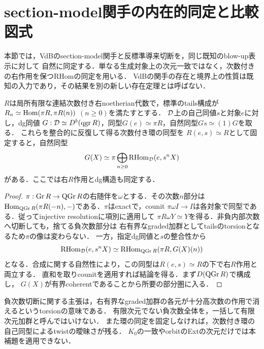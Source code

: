 \section{section-model関手の内在的同定と比較図式}\label{sec:canonicalcomparison}
本節では，VdBのsection-model関手と反標準導来切断を，同じ既知のblow-up表示に対して
自然に同定する．単なる生成対象上の次元一致ではなく，次数付きの右作用を保つRHomの同定を用いる．
VdBの関手の存在と境界上の性質は既知の入力であり，その結果を別の新しい存在定理とは呼ばない．

\begin{lemma}[導来切断によるpointed関手の認識]\label{lem:pointedrecognition}
$R$は局所有限な連結次数付き右noetherian代数で，標準のtails構成が
$R_n\simeq\operatorname{Hom}(\pi R,\pi R(n))$ $(n\ge0)$を満たすとする．
$\mathcal D$上の自己同値$s$と対象$e$に対し，dg同値
$G:\mathcal D\simeq D^b(\operatorname{qgr} R)$，同型$G(e)\simeq\pi R$，自然同型$Gs\simeq(1)G$を取る．
これらを整合的に反復して得る次数付き環の同型を
$R(e,s)\simeq R$として固定すると，自然同型
\[
 G(X)\simeq\pi\bigoplus_{n\ge0}\operatorname{RHom}_{\mathcal D}(e,s^nX)
\]
がある．ここでは右$R$作用とdg構造も同定する．
\end{lemma}
\begin{proof}
$\pi:\operatorname{Gr}R\to\operatorname{QGr} R$の右随伴を$\omega$とする．その次数$n$部分は
$\operatorname{Hom}_{\operatorname{QGr} R}(\pi R(-n),-)$である．$\pi$はexactで，counit
$\pi\omega I\to I$は各対象で同型である．従ってinjective resolutionに項別に適用して
$\pi R\omega Y\simeq Y$を得る．非負内部次数へ切断しても，捨てる負次数部分は
右有界なgraded加群としてtailsのtorsionとなるため$\pi$の像は変わらない．
一方，指定dg同値と$s$の整合性から
\[
 \operatorname{RHom}_{\mathcal D}(e,s^nX)
 \simeq\operatorname{RHom}_{\operatorname{QGr} R}(\pi R,G(X)(n))
\]
となる．合成に関する自然性により，この同型は$R(e,s)\simeq R$の下で右$R$作用と両立する．
直和を取りcounitを適用すれば結論を得る．まず$D(\operatorname{QGr} R)$で構成し，
$G(X)$が有界coherentであることから所要の部分圏に入る．
\end{proof}
\begin{remark}
負次数切断に関する主張は，右有界なgraded加群の各元が十分高次数の作用で消えるというtorsionの意味である．
有限次元でない負次数全体を，一括して有限次元加群と呼んではいけない．
また環の同定を固定しなければ，次数付き環の自己同型によるtwistの曖昧さが残る．
$K_0$の一致やorbitのExtの次元だけでは本補題を適用できない．
\end{remark}

